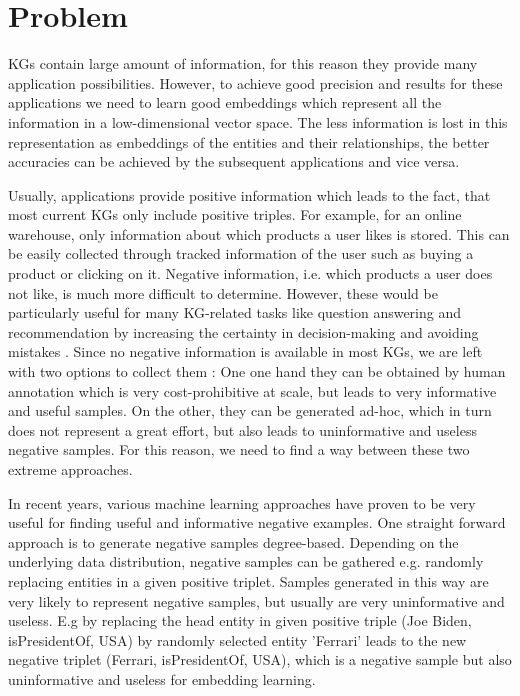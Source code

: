 \chapter{Problem}
\label{ch:problem}

\acp{KG} contain large amount of information, for this reason they provide many application possibilities.
However, to achieve good precision and results for these applications we need to learn good embeddings which represent all the information in a low-dimensional vector space.
The less information is lost in this representation as embeddings of the entities and their relationships, the better accuracies can be achieved by the subsequent applications and vice versa.

Usually, applications provide positive information which leads to the fact, that most current \acp{KG} only include positive triples.
For example, for an online warehouse, only information about which products a user likes is stored.
This can be easily collected through tracked information of the user such as buying a product or clicking on it.
Negative information, i.e. which products a user does not like, is much more difficult to determine.
However, these would be particularly useful for many \ac{KG}-related tasks like question answering and recommendation by increasing the certainty in decision-making and avoiding mistakes \cite{safavi2021negater}.
Since no negative information is available in most \acp{KG}, we are left with two options to collect them \cite{safavi2021negater}: 
One one hand they can be obtained by human annotation which is very cost-prohibitive at scale, but leads to very informative and useful samples. 
On the other, they can be generated ad-hoc, which in turn does not represent a great effort, but also leads to uninformative and useless negative samples.
For this reason, we need to find a way between these two extreme approaches.

In recent years, various machine learning approaches have proven to be very useful for finding useful and informative negative examples.
One straight forward approach is to generate negative samples degree-based.
Depending on the underlying data distribution, negative samples can be gathered e.g. randomly replacing entities in a given positive triplet.
Samples generated in this way are very likely to represent negative samples, but usually are very uninformative and useless.
E.g by replacing the head entity in given positive triple (Joe Biden, isPresidentOf, USA) by randomly selected entity 'Ferrari' leads to the new negative triplet (Ferrari, isPresidentOf, USA), which is a negative sample but also uninformative and useless for embedding learning.

